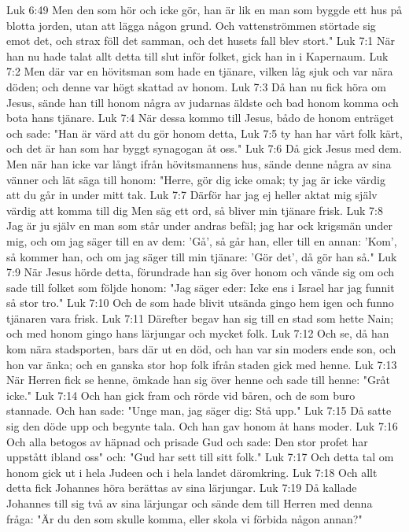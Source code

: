 Luk 6:49  Men den som hör och icke gör, han är lik en man som byggde ett hus på blotta jorden, utan att lägga någon grund. Och vattenströmmen störtade sig emot det, och strax föll det samman, och det husets fall blev stort."
Luk 7:1  När han nu hade talat allt detta till slut inför folket, gick han in i Kapernaum.
Luk 7:2  Men där var en hövitsman som hade en tjänare, vilken låg sjuk och var nära döden; och denne var högt skattad av honom.
Luk 7:3  Då han nu fick höra om Jesus, sände han till honom några av judarnas äldste och bad honom komma och bota hans tjänare.
Luk 7:4  När dessa kommo till Jesus, bådo de honom enträget och sade: "Han är värd att du gör honom detta,
Luk 7:5  ty han har vårt folk kärt, och det är han som har byggt synagogan åt oss."
Luk 7:6  Då gick Jesus med dem. Men när han icke var långt ifrån hövitsmannens hus, sände denne några av sina vänner och lät säga till honom: "Herre, gör dig icke omak; ty jag är icke värdig att du går in under mitt tak.
Luk 7:7  Därför har jag ej heller aktat mig själv värdig att komma till dig Men säg ett ord, så bliver min tjänare frisk.
Luk 7:8  Jag är ju själv en man som står under andras befäl; jag har ock krigsmän under mig, och om jag säger till en av dem: 'Gå', så går han, eller till en annan: 'Kom', så kommer han, och om jag säger till min tjänare: 'Gör det', då gör han så."
Luk 7:9  När Jesus hörde detta, förundrade han sig över honom och vände sig om och sade till folket som följde honom: "Jag säger eder: Icke ens i Israel har jag funnit så stor tro."
Luk 7:10  Och de som hade blivit utsända gingo hem igen och funno tjänaren vara frisk.
Luk 7:11  Därefter begav han sig till en stad som hette Nain; och med honom gingo hans lärjungar och mycket folk.
Luk 7:12  Och se, då han kom nära stadsporten, bars där ut en död, och han var sin moders ende son, och hon var änka; och en ganska stor hop folk ifrån staden gick med henne.
Luk 7:13  När Herren fick se henne, ömkade han sig över henne och sade till henne: "Gråt icke."
Luk 7:14  Och han gick fram och rörde vid båren, och de som buro stannade. Och han sade: "Unge man, jag säger dig: Stå upp."
Luk 7:15  Då satte sig den döde upp och begynte tala. Och han gav honom åt hans moder.
Luk 7:16  Och alla betogos av häpnad och prisade Gud och sade: Den stor profet har uppstått ibland oss" och: "Gud har sett till sitt folk."
Luk 7:17  Och detta tal om honom gick ut i hela Judeen och i hela landet däromkring.
Luk 7:18  Och allt detta fick Johannes höra berättas av sina lärjungar.
Luk 7:19  Då kallade Johannes till sig två av sina lärjungar och sände dem till Herren med denna fråga: "Är du den som skulle komma, eller skola vi förbida någon annan?"
